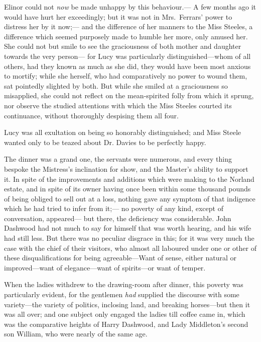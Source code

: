 \documentclass{article}
\begin{document}
Elinor could not \emph{now} be made unhappy by this behaviour.---%
A few months ago it would have hurt her exceedingly; but it
was not in Mrs.\ Ferrars' power to distress her by it now;---%
and the difference of her manners to the Miss Steeles,
a difference which seemed purposely made to humble her more,
only amused her.  She could not but smile to see the graciousness
of both mother and daughter towards the very person---%
for Lucy was particularly distinguished---whom of all others,
had they known as much as she did, they would have been most
anxious to mortify; while she herself, who had comparatively
no power to wound them, sat pointedly slighted by both.
But while she smiled at a graciousness so misapplied,
she could not reflect on the mean-spirited folly from
which it sprung, nor observe the studied attentions
with which the Miss Steeles courted its continuance,
without thoroughly despising them all four.

Lucy was all exultation on being so honorably
distinguished; and Miss Steele wanted only to be teazed
about Dr. Davies to be perfectly happy.

The dinner was a grand one, the servants were numerous,
and every thing bespoke the Mistress's inclination
for show, and the Master's ability to support it.
In spite of the improvements and additions which were
making to the Norland estate, and in spite of its owner
having once been within some thousand pounds of being
obliged to sell out at a loss, nothing gave any symptom
of that indigence which he had tried to infer from it;---%
no poverty of any kind, except of conversation, appeared---%
but there, the deficiency was considerable.  John Dashwood
had not much to say for himself that was worth hearing,
and his wife had still less.  But there was no peculiar
disgrace in this; for it was very much the case with
the chief of their visitors, who almost all laboured
under one or other of these disqualifications for being
agreeable---Want of sense, either natural or improved---want
of elegance---want of spirits---or want of temper.

When the ladies withdrew to the drawing-room
after dinner, this poverty was particularly evident,
for the gentlemen \emph{had} supplied the discourse with some
variety---the variety of politics, inclosing land,
and breaking horses---but then it was all over; and one
subject only engaged the ladies till coffee came in,
which was the comparative heights of Harry Dashwood,
and Lady Middleton's second son William, who were nearly
of the same age.
\end{document}
